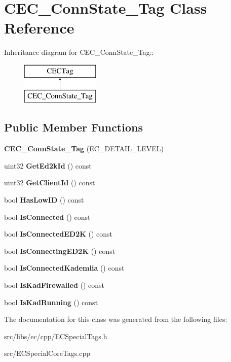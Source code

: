 \section{CEC\_\-ConnState\_\-Tag Class Reference}
\label{classCEC__ConnState__Tag}
Inheritance diagram for CEC\_\-ConnState\_\-Tag::\begin{figure}[H]
\begin{center}
\leavevmode
\includegraphics[height=2cm]{classCEC__ConnState__Tag}
\end{center}
\end{figure}
\subsection*{Public Member Functions}
\begin{DoxyCompactItemize}
\item 
{\bfseries CEC\_\-ConnState\_\-Tag} (EC\_\-DETAIL\_\-LEVEL)\label{classCEC__ConnState__Tag_ac47da5039fb5a9d45645e9e446925bfc}

\item 
uint32 {\bfseries GetEd2kId} () const \label{classCEC__ConnState__Tag_ac0722a0da40f35189060813f3460d221}

\item 
uint32 {\bfseries GetClientId} () const \label{classCEC__ConnState__Tag_a3d1b5b2e596bfb25334ac0ddafb7813d}

\item 
bool {\bfseries HasLowID} () const \label{classCEC__ConnState__Tag_a681bc3aedefaad6b7c7102318289ecd5}

\item 
bool {\bfseries IsConnected} () const \label{classCEC__ConnState__Tag_adc4f5dbff2c9c2644b170505a3ede608}

\item 
bool {\bfseries IsConnectedED2K} () const \label{classCEC__ConnState__Tag_a10b0899a24863284e6f1c18c1fac48e8}

\item 
bool {\bfseries IsConnectingED2K} () const \label{classCEC__ConnState__Tag_a9bddc602e75735f90ba5ba985aaf8ff1}

\item 
bool {\bfseries IsConnectedKademlia} () const \label{classCEC__ConnState__Tag_ad96bca3f82d8636558ea070c0ea083d5}

\item 
bool {\bfseries IsKadFirewalled} () const \label{classCEC__ConnState__Tag_aac9d911c02c588ca4d9b4b5e5a1a267d}

\item 
bool {\bfseries IsKadRunning} () const \label{classCEC__ConnState__Tag_adbc48dc80c3c9c4d129addb702923a5e}

\end{DoxyCompactItemize}


The documentation for this class was generated from the following files:\begin{DoxyCompactItemize}
\item 
src/libs/ec/cpp/ECSpecialTags.h\item 
src/ECSpecialCoreTags.cpp\end{DoxyCompactItemize}
